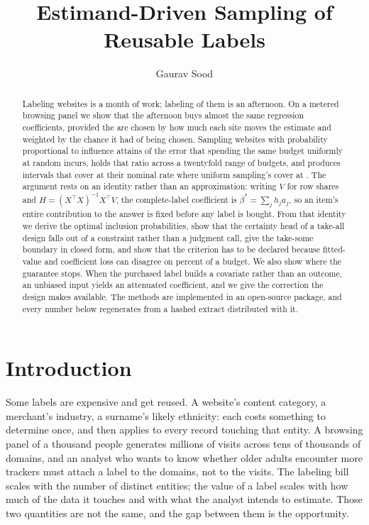 \documentclass[11pt]{article}
\title{Estimand-Driven Sampling of Reusable Labels}
\author{Gaurav Sood}
\date{}
\theoremstyle{plain}
\theoremstyle{remark}
\begin{document}
\maketitle

\begin{abstract}
Labeling \LabeledDomains{} websites is a month of work; labeling \HeadlineBudget{} of them is an afternoon. On a metered browsing panel we show that the afternoon buys almost the same regression coefficients, provided the \HeadlineBudget{} are chosen by how much each site moves the estimate and weighted by the chance it had of being chosen. Sampling websites with probability proportional to influence attains \EffAtTwoFifty{} of the error that spending the same budget uniformly at random incurs, holds that ratio across a twentyfold range of budgets, and produces intervals that cover at their nominal rate where uniform sampling's cover at \SrsCoverageLo{}. The argument rests on an identity rather than an approximation: writing $V$ for row shares and $H=(X^\top X)^{-1}X^\top V$, the complete-label coefficient is $\beta^*=\sum_j h_j a_j$, so an item's entire contribution to the answer is fixed before any label is bought. From that identity we derive the optimal inclusion probabilities, show that the certainty head of a take-all design falls out of a constraint rather than a judgment call, give the take-some boundary in closed form, and show that the criterion has to be declared because fitted-value and coefficient loss can disagree on \LossDisagreementPct{} percent of a budget. We also show where the guarantee stops. When the purchased label builds a covariate rather than an outcome, an unbiased input yields an attenuated coefficient, and we give the correction the design makes available. The methods are implemented in an open-source package, and every number below regenerates from a hashed extract distributed with it.
\end{abstract}

\section{Introduction}

Some labels are expensive and get reused. A website's content category, a merchant's industry, a surname's likely ethnicity: each costs something to determine once, and then applies to every record touching that entity. A browsing panel of a thousand people generates millions of visits across tens of thousands of domains, and an analyst who wants to know whether older adults encounter more trackers must attach a label to the domains, not to the visits. The labeling bill scales with the number of distinct entities; the value of a label scales with how much of the data it touches and with what the analyst intends to estimate. Those two quantities are not the same, and the gap between them is the opportunity.
\end{document}
